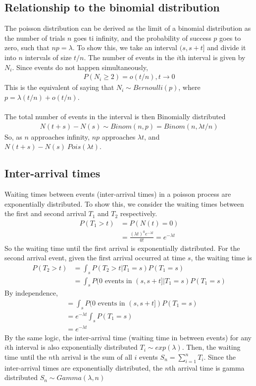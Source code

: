 \documentclass[12pt]{report}
\begin{document}
\subsection{Relationship to the binomial distribution}
The poisson distribution can be derived as the limit of a binomial distribution as the number of trials $n$ goes ti infinity, and the probability of success $p$ goes to zero, such that $np = \lambda$. To show this, we take an interval $(s, s+t]$ and divide it into $n$ intervals of size $t/n$. The number of events in the $i$th interval is given by $N_i$. Since events do not happen simultaneously,
\begin{align*}
P(N_i\ge2) = o(t/n),  t\rightarrow0
\end{align*}
This is the equivalent of saying that $N_i \sim Bernoulli(p)$, where $p = \lambda(t/n) + o(t/n)$.\\\\
The total number of events in the interval is then Binomially distributed
\begin{align*}
 N(t+s) - N(s) \sim Binom(n,p) = Binom(n, \lambda t/n)
\end{align*}
 So, as $n$ approaches infinity, $np$ approaches $\lambda t$, and $N(t+s) - N(s) ~ Pois(\lambda t)$.

\subsection{Inter-arrival times}
Waiting times between events (inter-arrival times) in a poisson process are exponentially distributed. To show this, we consider the waiting times between the first and second arrival $T_1$ and $T_2$ respectively.
\begin{align*}
P(T_1 > t) &= P(N(t) = 0)\\
&= \frac{(\lambda t)^0 e^{-\lambda t}}{0!} = e^{-\lambda t}
\end{align*}
So the waiting time until the first arrival is exponentially distributed. For the second arrival event, given the first arrival occurred at time $s$, the waiting time is
\begin{align*}
P(T_2 > t) &= \int_s P(T_2 > t | T_1 = s) P(T_1 = s)\\
&= \int_s P(0 \text{ events in }(s, s+t] | T_1 = s) P(T_1 = s) 
\end{align*}
By independence,
\begin{align*}
&=\int_s  P(0 \text{ events in } (s, s+t] ) P(T_1 = s) \\
&= e^{-\lambda t}\int_s P(T_1 = s) \\
&= e^{-\lambda t}
\end{align*}
By the same logic, the inter-arrival time (waiting time in between events) for any $i$th interval is also exponentially distributed $T_i \sim exp(\lambda)$. Then, the waiting time until the $n$th arrival is the sum of all $i$ events $S_n = \sum_{i=1}^n T_i$. Since the inter-arrival times are exponentially distributed, the $n$th arrival time is gamma distributed $S_n \sim Gamma(\lambda, n)$
\end{document}
